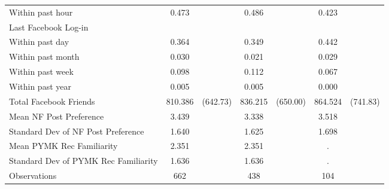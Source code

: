{\begin{tabular}{l*{3}{cc}}
\hspace{3mm} Within past hour&       0.473&            &       0.486&            &       0.423&            \\
Last Facebook Log-in&            &            &            &            &            &            \\
\hspace{3mm} Within past day&       0.364&            &       0.349&            &       0.442&            \\
\hspace{3mm} Within past month&       0.030&            &       0.021&            &       0.029&            \\
\hspace{3mm} Within past week&       0.098&            &       0.112&            &       0.067&            \\
\hspace{3mm} Within past year&       0.005&            &       0.005&            &       0.000&            \\
Total Facebook Friends&     810.386&    (642.73)&     836.215&    (650.00)&     864.524&    (741.83)\\
Mean NF Post Preference&       3.439&            &       3.338&            &       3.518&            \\
Standard Dev of NF Post Preference&       1.640&            &       1.625&            &       1.698&            \\
Mean PYMK Rec Familiarity&       2.351&            &       2.351&            &           .&            \\
Standard Dev of PYMK Rec Familiarity&       1.636&            &       1.636&            &           .&            \\
\midrule
Observations        &         662&            &         438&            &         104&            \\
\bottomrule
\end{tabular}
}
